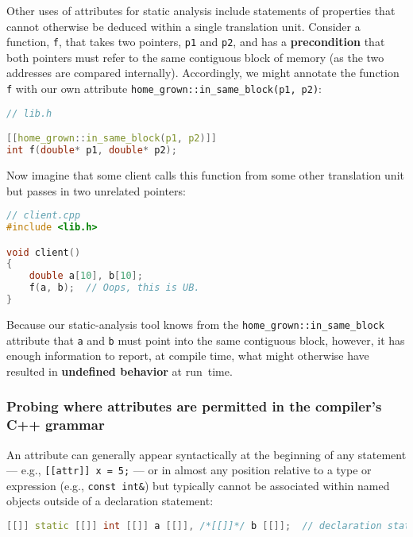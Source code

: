 Other uses of attributes for static analysis include statements of
properties that cannot otherwise be deduced within a single translation
unit. Consider a function, \texttt{f}, that takes two pointers,
\texttt{p1} and \texttt{p2}, and has a \textbf{precondition} that both
pointers must refer to the same contiguous block of memory (as the two
addresses are compared internally). Accordingly, we might annotate the
function \texttt{f} with our own attribute
\texttt{home\_grown::in\_same\_block(p1,}~\texttt{p2)}:

\begin{lstlisting}[language=C++]
// lib.h

[[home_grown::in_same_block(p1, p2)]]
int f(double* p1, double* p2);
\end{lstlisting}
    
\noindent Now imagine that some client calls this function from some other
translation unit but passes in two unrelated pointers:

\begin{lstlisting}[language=C++]
// client.cpp
#include <lib.h>

void client()
{
    double a[10], b[10];
    f(a, b);  // Oops, this is UB.
}
\end{lstlisting}
    
\noindent Because our static-analysis tool knows from the
\texttt{home\_grown::in\_same\_block} attribute that \texttt{a} and
\texttt{b} must point into the same contiguous block, however, it has
enough information to report, at compile time, what might otherwise have
resulted in \textbf{undefined behavior} at run~time.

\subsubsection[Probing where attributes are permitted in the compiler’s C++ grammar]{Probing where attributes are permitted in the compiler’s C++ grammar}\label{probing-where-attributes-are-permitted-in-the-compiler’s-c++-grammar}

An attribute can generally appear syntactically at the beginning of any
statement --- e.g.,
\texttt{[[attr]]}~\texttt{x}~\texttt{=}~\texttt{5;} --- or in almost any
position relative to a type or expression (e.g.,
\texttt{const}~\texttt{int\&}) but typically cannot be associated
within named objects outside of a declaration statement:

\begin{lstlisting}[language=C++]
[[]] static [[]] int [[]] a [[]], /*[[]]*/ b [[]];  // declaration statement
\end{lstlisting}
    

